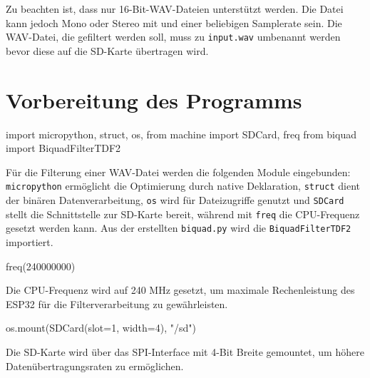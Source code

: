 \documentclass[
  ngerman,
  letterpaper,
  DIV=11]{scrreprt}
\newenvironment{Shaded}{\begin{snugshade}}{\end{snugshade}}
\newcommand{\DecValTok}[1]{\textcolor[rgb]{0.68,0.00,0.00}{#1}}
\newcommand{\ImportTok}[1]{\textcolor[rgb]{0.00,0.46,0.62}{#1}}
\newcommand{\NormalTok}[1]{\textcolor[rgb]{0.00,0.23,0.31}{#1}}
\newcommand{\OperatorTok}[1]{\textcolor[rgb]{0.37,0.37,0.37}{#1}}
\newcommand{\StringTok}[1]{\textcolor[rgb]{0.13,0.47,0.30}{#1}}
\begin{document}
Zu beachten ist, dass nur 16-Bit-WAV-Dateien unterstützt werden. Die
Datei kann jedoch Mono oder Stereo mit und einer beliebigen Samplerate
sein. Die WAV-Datei, die gefiltert werden soll, muss zu
\texttt{input.wav} umbenannt werden bevor diese auf die SD-Karte
übertragen wird.

\section{Vorbereitung des Programms}\label{vorbereitung-des-programms}

\begin{Shaded}
\begin{Highlighting}[]
\ImportTok{import}\NormalTok{ micropython, struct, os,}
\ImportTok{from}\NormalTok{ machine }\ImportTok{import}\NormalTok{ SDCard, freq}
\ImportTok{from}\NormalTok{ biquad }\ImportTok{import}\NormalTok{ BiquadFilterTDF2}
\end{Highlighting}
\end{Shaded}

Für die Filterung einer WAV-Datei werden die folgenden Module
eingebunden: \texttt{micropython} ermöglicht die Optimierung durch
native Deklaration, \texttt{struct} dient der binären Datenverarbeitung,
\texttt{os} wird für Dateizugriffe genutzt und \texttt{SDCard} stellt
die Schnittstelle zur SD-Karte bereit, während mit \texttt{freq} die
CPU-Frequenz gesetzt werden kann. Aus der erstellten \texttt{biquad.py}
wird die \texttt{BiquadFilterTDF2} importiert.

\begin{Shaded}
\begin{Highlighting}[]
\NormalTok{freq(}\DecValTok{240000000}\NormalTok{)}
\end{Highlighting}
\end{Shaded}

Die CPU-Frequenz wird auf 240 MHz gesetzt, um maximale Rechenleistung
des ESP32 für die Filterverarbeitung zu gewährleisten.

\begin{Shaded}
\begin{Highlighting}[]
\NormalTok{os.mount(SDCard(slot}\OperatorTok{=}\DecValTok{1}\NormalTok{, width}\OperatorTok{=}\DecValTok{4}\NormalTok{), }\StringTok{"/sd"}\NormalTok{)}
\end{Highlighting}
\end{Shaded}

Die SD-Karte wird über das SPI-Interface mit 4-Bit Breite gemountet, um
höhere Datenübertragungsraten zu ermöglichen.
\end{document}
